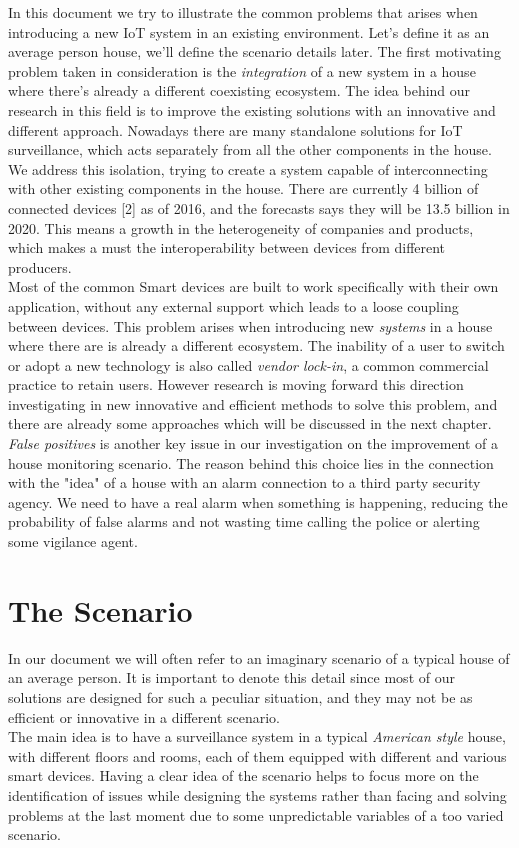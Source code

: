 In this document we try to illustrate the common problems that arises
when introducing a new IoT system in an existing environment. Let's define it as
an average person house, we'll define the scenario details later.
The first motivating problem taken in consideration is the \textit{integration} of a new
system in a house where there's already a different coexisting ecosystem.
The idea behind our research in this field is to improve the existing solutions
with an innovative and different approach. Nowadays there are many standalone
solutions for IoT surveillance, which acts separately from all the other
components in the house. We address this isolation, trying to create
a system capable of interconnecting with other existing components in the house.
There are currently 4 billion of connected devices [2] as of 2016, and the forecasts
says they will be 13.5 billion in 2020. This means a growth in the heterogeneity of companies
and products, which makes a must the interoperability between devices from different
producers.\\
Most of the common Smart devices are built to work specifically with their own application,
without any external support which leads to a loose coupling between devices. This problem
arises when introducing new \textit{systems} in a house where there are is already a different
ecosystem. The inability of a user to switch or adopt a new technology is also called \textit{vendor lock-in},
a common commercial practice to retain users. However research is moving forward
this direction investigating in new innovative and efficient methods to solve this
problem, and there are already some approaches which will be discussed in the next chapter.
\textit{False positives} is another key issue in our investigation on the improvement of a
house monitoring scenario. The reason behind this choice lies in the connection with the "idea"
of a house with an alarm connection to a third party security agency. We need to have a real
alarm when something is happening, reducing the probability of false alarms and not wasting time
calling the police or alerting some vigilance agent.


\section{The Scenario}

In our document we will often refer to an imaginary scenario of a typical house
of an average person. It is important to denote this detail since most of our
solutions are designed for such a peculiar situation, and they may not be as
efficient or innovative in a different scenario.\\
The main idea is to have a surveillance system in a typical \textit{American style}
house, with different floors and rooms, each of them equipped with different
and various smart devices. Having a clear idea of the scenario helps to focus more
on the identification of issues while designing the systems rather than facing
and solving problems at the last moment due to some unpredictable variables of a
too varied scenario.

